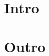 \documentclass{article}
\begin{document}
\tableofcontents

\newpage

\section{Intro}


\section{Outro}

\end{document}
